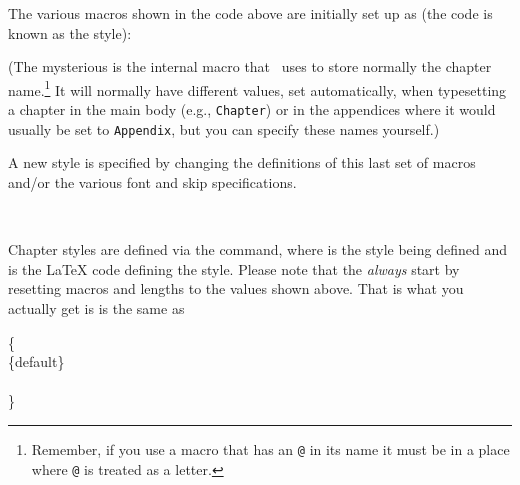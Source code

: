 The various macros shown in the  code above are initially 
set up as (the code is known as the  style): 
\begin{lcode}
\newcommand{\chapterheadstart}{\vspace*{\beforechapskip}}
\newcommand{\printchaptername}{\chapnamefont \@chapapp}
\newcommand{\chapternamenum}{\space}
\newcommand{\printchapternum}{\chapnumfont \thechapter}
\newcommand{\afterchapternum}{\par\nobreak\vskip \midchapskip}
\newcommand{\printchapternonum}{}
\newcommand{\printchaptertitle}[1]{\chaptitlefont #1}
\newcommand{\afterchaptertitle}{\par\nobreak\vskip \afterchapskip}
\newcommand{\chapnamefont}{\normalfont\huge\bfseries}
\newcommand{\chapnumfont}{\normalfont\huge\bfseries}
\newcommand{\chaptitlefont}{\normalfont\Huge\bfseries}
\setlength{\beforechapskip}{50pt}
\setlength{\midchapskip}{20pt}
\setlength{\afterchapskip}{40pt}
\end{lcode}
(The mysterious \cmd{\@chapapp} is the internal macro that \ltx\ uses
to store normally the chapter name.\footnote{Remember, if you use
a macro that has an \texttt{@} in its name it must be in a place
where \texttt{@} is treated as a letter.} It will normally have 
different values,
set automatically, when typesetting a chapter in the main body 
(e.g., \texttt{Chapter}) or in the appendices where
it would usually be set to \texttt{Appendix}, but you can specify
these names yourself.)



    A new style is specified by changing the definitions of this last set of 
macros and/or the various font and skip specifications.

\begin{syntax}
\cmd{\makechapterstyle} \\
\end{syntax}
Chapter styles are defined via the \cmd{\makechapterstyle} command, where
 is the style being defined and  is the LaTeX code 
defining the style. Please note that the  \emph{always}
start by resetting macros and lengths to the values shown above. That
is what you actually get is is the same as
\begin{syntax}
\cmd{\makechapterstyle}\{\\
  \cmd{\chapterstyle}\{default\}\\
  \\
\} 
\end{syntax}



